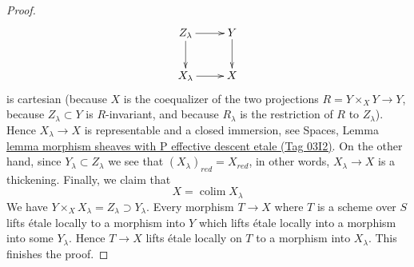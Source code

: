 \documentclass{amsart}
\theoremstyle{plain}
\theoremstyle{definition}
\theoremstyle{remark}
\numberwithin{equation}{subsection}
\def\colim{\mathop{\mathrm{colim}}\nolimits}
\begin{document}
\begin{proof}
$$
\xymatrix{
Z_\lambda \ar[r] \ar[d] & Y \ar[d] \\
X_\lambda \ar[r] & X
}
$$
is cartesian (because $X$ is the coequalizer of the two projections
$R = Y \times_X Y \to Y$, because $Z_\lambda \subset Y$ is $R$-invariant,
and because $R_\lambda$ is the restriction of $R$ to $Z_\lambda$).
Hence $X_\lambda \to X$ is representable and a closed immersion, see
Spaces, Lemma
\href{https://stacks.math.columbia.edu/tag/03I2}{lemma morphism sheaves with P effective descent etale (Tag 03I2)}.
On the other hand, since $Y_\lambda \subset Z_\lambda$ we see that
$(X_\lambda)_{red} = X_{red}$, in other words, $X_\lambda \to X$
is a thickening. Finally, we claim that
$$
X = \colim X_\lambda
$$
We have $Y \times_X X_\lambda = Z_\lambda \supset Y_\lambda$. Every
morphism $T \to X$ where $T$ is a scheme over $S$ lifts \'etale locally
to a morphism into $Y$ which lifts \'etale locally into a morphism
into some $Y_\lambda$. Hence $T \to X$ lifts \'etale locally on
$T$ to a morphism into $X_\lambda$. This finishes the proof.
\end{proof}
\end{document}
